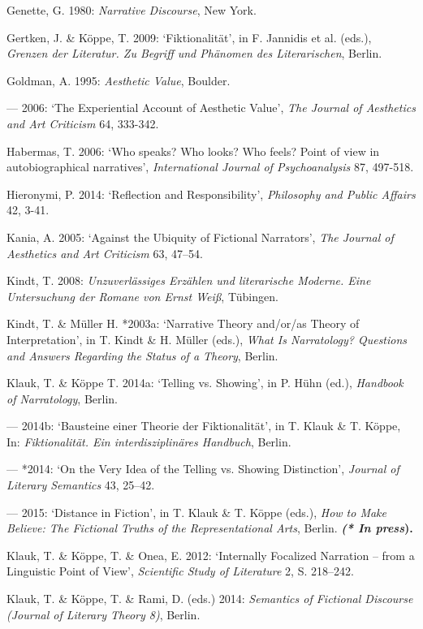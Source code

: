 \begin{hangparas}{.5cm}{1}
Genette, G. 1980: \emph{Narrative Discourse}, New York. 

Gertken, J. \& K\"oppe, T. 2009: `Fiktionalit\"at', in F. Jannidis et al. (eds.), \emph{Grenzen der Literatur. Zu Begriff und Ph\"anomen des Literarischen}, Berlin. 

Goldman, A. 1995: \emph{Aesthetic Value}, Boulder. 

--- 2006: `The Experiential Account of Aesthetic Value', \emph{The Journal of Aesthetics and Art Criticism} 64, 333-342.

Habermas, T. 2006: `Who speaks? Who looks? Who feels? Point of view in autobiographical narratives', \emph{International Journal of Psychoanalysis} 87, 497-518. 

Hieronymi, P. 2014: `Reflection and Responsibility', \emph{Philosophy and Public Affairs} 42, 3-41.

Kania, A. 2005: `Against the Ubiquity of Fictional Narrators', \emph{The Journal of Aesthetics and Art Criticism} 63, 47--54.

Kindt, T. 2008: \emph{Unzuverl\"assiges Erz\"ahlen und literarische Moderne. Eine Untersuchung der Romane von Ernst Wei{\ss}}, T\"ubingen. 

Kindt, T. \& M\"uller H. *2003a: `Narrative Theory and/or/as Theory of Interpretation', in T. Kindt \& H. M\"uller (eds.), \emph{What Is Narratology? Questions and Answers Regarding the Status of a Theory}, Berlin.

Klauk, T. \& K\"oppe T. 2014a: `Telling vs. Showing', in P. H\"uhn (ed.), \emph{Handbook of Narratology}, Berlin.

--- 2014b: `Bausteine einer Theorie der Fiktionalit\"at', in T. Klauk \& T. K\"oppe, In: \emph{Fiktionalit\"at. Ein interdisziplin\"ares Handbuch}, Berlin.

--- *2014: `On the Very Idea of the Telling vs. Showing Distinction', \emph{Journal of Literary Semantics} 43, 25--42.

--- 2015: `Distance in Fiction', in T. Klauk \& T. K\"oppe (eds.), \emph{How to Make Believe: The Fictional Truths of the Representational Arts}, Berlin. \textbf{\emph{(* In press}).}

Klauk, T. \& K\"oppe, T. \& Onea, E. 2012: `Internally Focalized Narration -- from a Linguistic Point of View', \emph{Scientific Study of Literature} 2, S. 218--242.

Klauk, T. \& K\"oppe, T. \& Rami, D. (eds.) 2014: \emph{Semantics of Fictional Discourse (Journal of Literary Theory 8)}, Berlin.


\end{hangparas}
